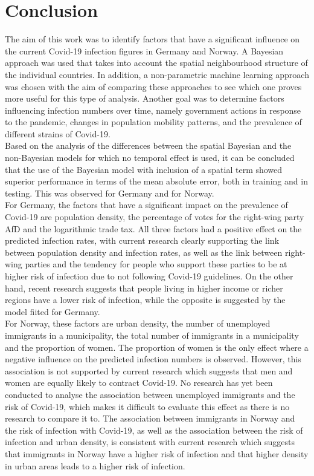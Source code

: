 %
\chapter{Conclusion}\label{sec:conclussion}
The aim of this work was to identify factors that have a significant influence on the current Covid-19 infection figures in Germany and Norway. A Bayesian approach was used that takes into account the spatial neighbourhood structure of the individual countries. In addition, a non-parametric machine learning approach was chosen with the aim of comparing these approaches to see which one proves more useful for this type of analysis. Another goal was to determine factors influencing infection numbers over time, namely government actions in response to the pandemic, changes in population mobility patterns, and the prevalence of different strains of Covid-19. \\
Based on the analysis of the differences between the spatial Bayesian and the non-Bayesian models for which no temporal effect is used, it can be concluded that the use of the Bayesian model with inclusion of a spatial term showed superior performance in terms of the mean absolute error, both in training and in testing. This was observed for Germany and for Norway. \\
For Germany, the factors that have a significant impact on the prevalence of Covid-19 are population density, the percentage of votes for the right-wing party AfD and the logarithmic trade tax. All three factors had a positive effect on the predicted infection rates, with current research clearly supporting the link between population density and infection rates, as well as the link between right-wing parties and the tendency for people who support these parties to be at higher risk of infection due to not following Covid-19 guidelines. On the other hand, recent research suggests that people living in higher income or richer regions have a lower risk of infection, while the opposite is suggested by the model fiited for Germany. \\
For Norway, these factors are urban density, the number of unemployed immigrants in a municipality, the total number of immigrants in a municipality and the proportion of women. The proportion of women is the only effect where a negative influence on the predicted infection numbers is observed. However, this association is not supported by current research which suggests that men and women are equally likely to contract Covid-19. No research has yet been conducted to analyse the association between unemployed immigrants and the risk of Covid-19, which makes it difficult to evaluate this effect as there is no research to compare it to. The association between immigrants in Norway and the risk of infection with Covid-19, as well as the association between the risk of infection and urban density, is consistent with current research which suggests that immigrants in Norway have a higher risk of infection and that higher density in urban areas leads to a higher risk of infection. \\
